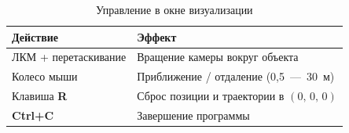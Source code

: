 \documentclass[../main.tex]{subfiles}
\begin{document}
\begin{table}[H]
\centering
\caption{Управление в окне визуализации}
\label{tab:controls}
\begin{tabularx}{\textwidth}{|l|X|}
\hline
\textbf{Действие} & \textbf{Эффект} \\
\hline
ЛКМ + перетаскивание & Вращение камеры вокруг объекта \\
\hline
Колесо мыши          & Приближение / отдаление (0{,}5~---~30~м) \\
\hline
Клавиша \textbf{R}   & Сброс позиции и траектории в $(0,\,0,\,0)$ \\
\hline
\textbf{Ctrl+C}      & Завершение программы \\
\hline
\end{tabularx}
\end{table}
 
\newpage
	
\end{document}
